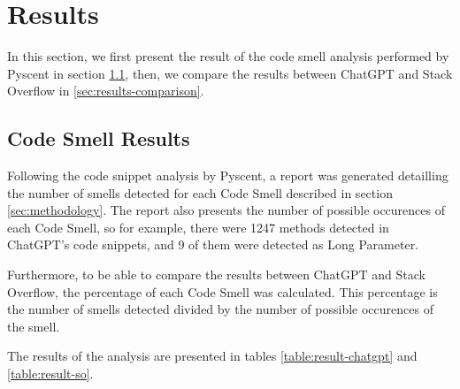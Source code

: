 \section{Results}
\label{sec:results}
In this section, we first present the result of the code smell analysis performed by Pyscent in section \ref{sec:results-code-smell}, then, we compare the results between ChatGPT and Stack Overflow in \ref{sec:results-comparison}.

\subsection{Code Smell Results}
\label{sec:results-code-smell}
Following the code snippet analysis by Pyscent, a report was generated detailling the number of smells detected for each Code Smell described in section \ref{sec:methodology}. The report also presents the number of possible occurences of each Code Smell, so for example, there were 1247 methods detected in ChatGPT's code snippets, and 9 of them were detected as Long Parameter.

Furthermore, to be able to compare the results between ChatGPT and Stack Overflow, the percentage of each Code Smell was calculated. This percentage is the number of smells detected divided by the number of possible occurences of the smell.

The results of the analysis are presented in tables \ref{table:result-chatgpt} and \ref{table:result-so}.

